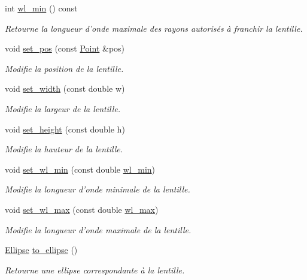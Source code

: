 \begin{DoxyCompactItemize}
int \hyperlink{classLens_aee260137e02f65dd1e3daf3ce21a85c2}{wl\+\_\+min} () const 
\begin{DoxyCompactList}\small\item\em Retourne la longueur d'onde maximale des rayons autorisés à franchir la lentille. \end{DoxyCompactList}\item 
void \hyperlink{classLens_a3bf3faa62c56d0282e46c2f0baa3b531}{set\+\_\+pos} (const \hyperlink{classPoint}{Point} \&pos)
\begin{DoxyCompactList}\small\item\em Modifie la position de la lentille. \end{DoxyCompactList}\item 
void \hyperlink{classLens_a7667bda90f872998cb19a027d1c4f3db}{set\+\_\+width} (const double w)
\begin{DoxyCompactList}\small\item\em Modifie la largeur de la lentille. \end{DoxyCompactList}\item 
void \hyperlink{classLens_a8242b785736433197468c6ef17fb37ee}{set\+\_\+height} (const double h)
\begin{DoxyCompactList}\small\item\em Modifie la hauteur de la lentille. \end{DoxyCompactList}\item 
void \hyperlink{classLens_a0fedf88bbe8eb0bdb4a5d20561f1344c}{set\+\_\+wl\+\_\+min} (const double \hyperlink{classLens_aee260137e02f65dd1e3daf3ce21a85c2}{wl\+\_\+min})
\begin{DoxyCompactList}\small\item\em Modifie la longueur d’onde minimale de la lentille. \end{DoxyCompactList}\item 
void \hyperlink{classLens_a7c0492c65283b7f51f54aef6c706d311}{set\+\_\+wl\+\_\+max} (const double \hyperlink{classLens_a0ffa3d4a046dd6d31ddc549bd91bc25d}{wl\+\_\+max})
\begin{DoxyCompactList}\small\item\em Modifie la longueur d’onde maximale de la lentille. \end{DoxyCompactList}\item 
\hyperlink{classEllipse}{Ellipse} \hyperlink{classLens_a32c53f8267002b2fa510c656f91600b9}{to\+\_\+ellipse} ()
\begin{DoxyCompactList}\small\item\em Retourne une ellipse correspondante à la lentille. \end{DoxyCompactList}\item 

\end{DoxyCompactItemize}
